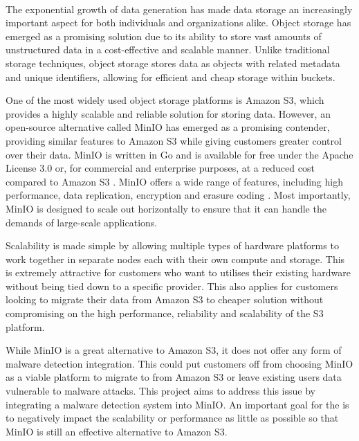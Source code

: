 \documentclass[12pt, conference, final, a4paper, onecolumn, compsoc]{IEEEtran}
\begin{document}
\paragraph{}
The exponential growth of data generation has made data storage an increasingly
important aspect for both individuals and organizations alike. Object storage
has emerged as a promising solution due to its ability to store vast amounts of
unstructured data in a cost-effective and scalable manner. Unlike traditional
storage techniques, object storage stores data as objects with related metadata
and unique identifiers, allowing for efficient and cheap storage within buckets.


One of the most widely used object storage platforms is Amazon S3, which
provides a highly scalable and reliable solution for storing data. However, an
open-source alternative called MinIO has emerged as a promising contender,
providing similar features to Amazon S3 while giving customers greater control
over their data. MinIO is written in Go and is available for free under the
Apache License 3.0 or, for commercial and enterprise purposes, at a reduced cost
compared to Amazon S3 \citep{minio-pricing}. MinIO offers a wide range of
features, including high performance, data replication, encryption and erasure
coding \citep{minio}. Most importantly, MinIO is designed to scale out
horizontally to ensure that it can handle the demands of large-scale
applications.

Scalability is made simple by allowing multiple types of hardware platforms to
work together in separate nodes each with their own compute and storage. This is
extremely attractive for customers who want to utilises their existing hardware
without being tied down to a specific provider. This also applies for customers
looking to migrate their data from Amazon S3 to cheaper solution without
compromising on the high performance, reliability and scalability of the S3
platform.

While MinIO is a great alternative to Amazon S3, it does not offer any form of
malware detection integration. This could put customers off from choosing MinIO
as a viable platform to migrate to from Amazon S3 or leave existing users data
vulnerable to malware attacks. This project aims to address this issue by
integrating a malware detection system into MinIO. An important goal for the is
to negatively impact the scalability or performance as little as possible so
that MinIO is still an effective alternative to Amazon S3.
\end{document}
